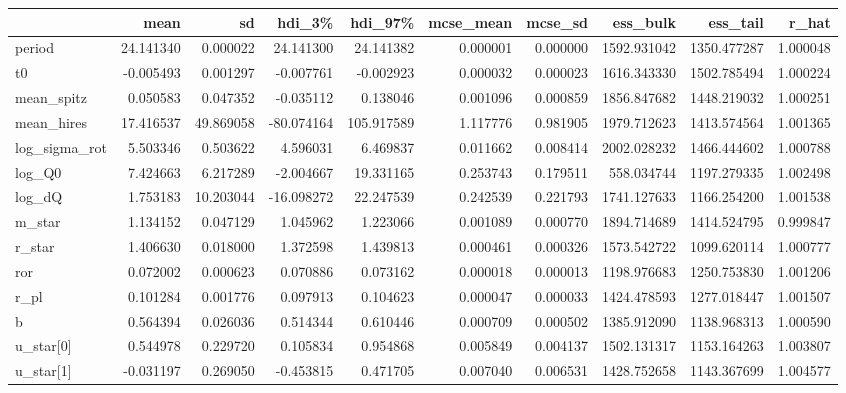 \begin{tabular}{lrrrrrrrrr}
\toprule
{} &       mean &         sd &     hdi\_3\% &     hdi\_97\% &  mcse\_mean &   mcse\_sd &     ess\_bulk &     ess\_tail &     r\_hat \\
\midrule
period        &  24.141340 &   0.000022 &  24.141300 &   24.141382 &   0.000001 &  0.000000 &  1592.931042 &  1350.477287 &  1.000048 \\
t0            &  -0.005493 &   0.001297 &  -0.007761 &   -0.002923 &   0.000032 &  0.000023 &  1616.343330 &  1502.785494 &  1.000224 \\
mean\_spitz    &   0.050583 &   0.047352 &  -0.035112 &    0.138046 &   0.001096 &  0.000859 &  1856.847682 &  1448.219032 &  1.000251 \\
mean\_hires    &  17.416537 &  49.869058 & -80.074164 &  105.917589 &   1.117776 &  0.981905 &  1979.712623 &  1413.574564 &  1.001365 \\
log\_sigma\_rot &   5.503346 &   0.503622 &   4.596031 &    6.469837 &   0.011662 &  0.008414 &  2002.028232 &  1466.444602 &  1.000788 \\
log\_Q0        &   7.424663 &   6.217289 &  -2.004667 &   19.331165 &   0.253743 &  0.179511 &   558.034744 &  1197.279335 &  1.002498 \\
log\_dQ        &   1.753183 &  10.203044 & -16.098272 &   22.247539 &   0.242539 &  0.221793 &  1741.127633 &  1166.254200 &  1.001538 \\
m\_star        &   1.134152 &   0.047129 &   1.045962 &    1.223066 &   0.001089 &  0.000770 &  1894.714689 &  1414.524795 &  0.999847 \\
r\_star        &   1.406630 &   0.018000 &   1.372598 &    1.439813 &   0.000461 &  0.000326 &  1573.542722 &  1099.620114 &  1.000777 \\
ror           &   0.072002 &   0.000623 &   0.070886 &    0.073162 &   0.000018 &  0.000013 &  1198.976683 &  1250.753830 &  1.001206 \\
r\_pl          &   0.101284 &   0.001776 &   0.097913 &    0.104623 &   0.000047 &  0.000033 &  1424.478593 &  1277.018447 &  1.001507 \\
b             &   0.564394 &   0.026036 &   0.514344 &    0.610446 &   0.000709 &  0.000502 &  1385.912090 &  1138.968313 &  1.000590 \\
u\_star[0]     &   0.544978 &   0.229720 &   0.105834 &    0.954868 &   0.005849 &  0.004137 &  1502.131317 &  1153.164263 &  1.003807 \\
u\_star[1]     &  -0.031197 &   0.269050 &  -0.453815 &    0.471705 &   0.007040 &  0.006531 &  1428.752658 &  1143.367699 &  1.004577 \\

\end{tabular}
